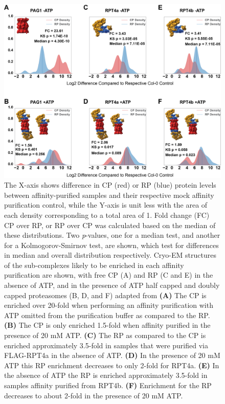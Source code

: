 \begin{figure}[ht]
	\centering
	\includegraphics[width=\columnwidth]{Proteasome/KDEplots.png}
	{The X-axis shows difference in CP (red) or RP (blue) protein levels between affinity-purified samples and their respective mock affinity purification control, while the Y-axis is unit less with the area of each density corresponding to a total area of 1. Fold change (FC) CP over RP, or RP over CP was calculated based on the median of these distributions. Two \textit{p}-values, one for a median test, and another for a Kolmogorov-Smirnov test, are shown, which test for differences in median and overall distribution respectively. Cryo-EM structures of the sub-complexes likely to be enriched in each affinity purification are shown, with free CP (A) and RP (C and E) in the absence of ATP, and in the presence of ATP half capped and doubly capped proteasomes (B, D, and F) adapted from \citep{beck12} \textbf{(A)} The CP is enriched over 20-fold when performing an affinity purification with ATP omitted from the purification buffer as compared to the RP. \textbf{(B)} The CP is only enriched 1.5-fold when affinity purified in the presence of 20 mM ATP. \textbf{(C)} The RP as compared to the CP is enriched approximately 3.5-fold in samples that were purified via FLAG-RPT4a in the absence of ATP. \textbf{(D)} In the presence of 20 mM ATP this RP enrichment decreases to only 2-fold for RPT4a. \textbf{(E)} In the absence of ATP the RP is enriched approximately 3.5-fold in samples affinity purified from RPT4b. \textbf{(F)} Enrichment for the RP decreases to about 2-fold in the presence of 20 mM ATP.}
	\label{fig:supkde}
\end{figure}

